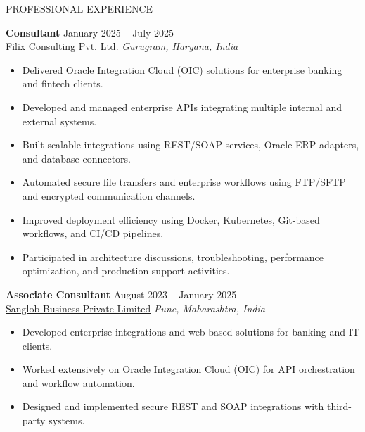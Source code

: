 \documentclass{resume}
\begin{document}
\begin{rSection}{PROFESSIONAL EXPERIENCE}

\textbf{Consultant} \hfill January 2025 -- July 2025 \\
\href{https://filixconsulting.com/}{Filix Consulting Pvt. Ltd.} \hfill \textit{Gurugram, Haryana, India}

\begin{itemize}[leftmargin=*]

\item Delivered Oracle Integration Cloud (OIC) solutions for enterprise banking and fintech clients.

\item Developed and managed enterprise APIs integrating multiple internal and external systems.

\item Built scalable integrations using REST/SOAP services, Oracle ERP adapters, and database connectors.

\item Automated secure file transfers and enterprise workflows using FTP/SFTP and encrypted communication channels.

\item Improved deployment efficiency using Docker, Kubernetes, Git-based workflows, and CI/CD pipelines.

\item Participated in architecture discussions, troubleshooting, performance optimization, and production support activities.

\end{itemize}


\textbf{Associate Consultant} \hfill August 2023 -- January 2025 \\
\href{https://sanglob.in/}{Sanglob Business Private Limited} \hfill \textit{Pune, Maharashtra, India}

\begin{itemize}[leftmargin=*]

\item Developed enterprise integrations and web-based solutions for banking and IT clients.

\item Worked extensively on Oracle Integration Cloud (OIC) for API orchestration and workflow automation.

\item Designed and implemented secure REST and SOAP integrations with third-party systems.


\end{itemize}
\end{rSection}
\end{document}
